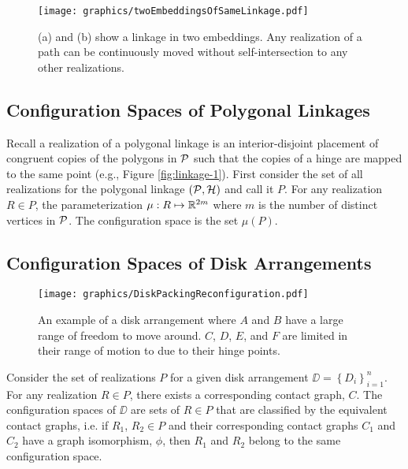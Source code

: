 \begin{figure}[!htbp]%
\begin{center}
\texttt{[image: graphics/twoEmbeddingsOfSameLinkage.pdf]}
\end{center} 
\caption{(a) and (b) show a linkage in two embeddings.  Any realization of a path can be continuously moved without self-intersection to any other realizations.}
\label{fig:configuration-3}
\end{figure}

\subsection{Configuration Spaces of Polygonal Linkages}
Recall a realization of a polygonal linkage is an interior-disjoint placement of congruent copies of the polygons in ${\cal P}$ such that the copies of a hinge are mapped to the same point (e.g., Figure \ref{fig:linkage-1}).
First consider the set of all realizations for the polygonal linkage $\left({\cal P},{\cal H}\right)$ and call it $P$.  
For any realization $R \in P$, the parameterization $\mu:R \mapsto {\mathbb{R}}^{2m}$ where $m$ is the number of distinct vertices in ${\cal P}$.  The configuration space is the set $\mu(P)$.

 \subsection{Configuration Spaces of Disk Arrangements}

\begin{figure}[!htbp]
\begin{center}
\texttt{[image: graphics/DiskPackingReconfiguration.pdf]}
\end{center} 
\caption{An example of a disk arrangement where $A$ and $B$ have a large range of freedom to move around.  $C$, $D$, $E$, and $F$ are limited in their range of motion to due to their hinge points.}
\label{fig:configuration-5}
\end{figure}

Consider the set of realizations $P$ for a given disk arrangement $\DD = \left\lbrace D_i \right\rbrace_{i=1}^n$.  For any realization $R \in P$, there exists a corresponding contact graph, $C$.  The configuration spaces of $\DD$ are sets of $R \in P$ that are classified by the equivalent contact graphs, i.e. if $R_1$, $R_2 \in P$ and their corresponding contact graphs $C_1$ and $C_2$ have a graph isomorphism, $\phi$, then $R_1$ and $R_2$ belong to the same configuration space.





